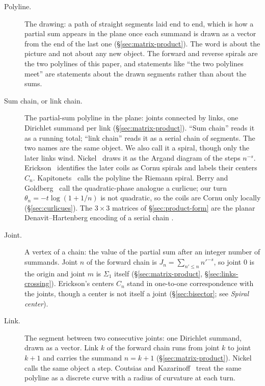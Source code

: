 \documentclass[11pt]{article}
\theoremstyle{definition}
\begin{document}
\begin{description}
\item[Polyline.]
The drawing: a path of straight segments laid end to end, which is
how a partial sum appears in the plane once each summand is drawn as
a vector from the end of the last one
(\S\ref{sec:matrix-product}).
The word is about the picture and not about any new object. The
forward and reverse spirals are the two polylines of this paper, and
statements like ``the two polylines meet'' are statements about the
drawn segments rather than about the sums.

\item[Sum chain, or link chain.]
The partial-sum polyline in the plane: joints connected by links,
one Dirichlet summand per link
(\S\ref{sec:matrix-product}).
``Sum chain'' reads it as a running total; ``link chain'' reads it
as a serial chain of segments. The two names are the same object.
We also call it a spiral, though only the later links wind.
Nickel~\cite{Nickel2013} draws it as the Argand diagram of the
steps $n^{-s}$.
Erickson~\cite{Erickson2005} identifies the later coils as Cornu
spirals and labels their centers $C_n$.
Kapitonets~\cite{Kapitonets2019} calls the polyline the Riemann
spiral.
Berry and Goldberg~\cite{BerryGoldberg1988} call the quadratic-phase
analogue a curlicue; our turn $\theta_n=-t\log(1+1/n)$ is not
quadratic, so the coils are Cornu only locally
(\S\ref{sec:curlicues}).
The $3\times3$ matrices of \S\ref{sec:product-form} are the planar
Denavit--Hartenberg encoding of a serial chain
\cite{DenavitHartenberg1955}.

\item[Joint.]
A vertex of a chain: the value of the partial sum after an integer
number of summands.
Joint $n$ of the forward chain is $J_n=\sum_{n'\le n}n'^{-s}$, so
joint $0$ is the origin and joint $m$ is $\Sigma_1$ itself
(\S\ref{sec:matrix-product}, \S\ref{sec:links-crossing}).
Erickson's centers $C_n$ stand in one-to-one correspondence with the
joints, though a center is not itself a joint
(\S\ref{sec:bisector}; see \emph{Spiral center}).

\item[Link.]
The segment between two consecutive joints: one Dirichlet summand,
drawn as a vector.
Link $k$ of the forward chain runs from joint $k$ to joint $k+1$ and
carries the summand $n=k+1$
(\S\ref{sec:matrix-product}).
Nickel calls the same object a step.
Coutsias and Kazarinoff~\cite{CoutsiasKazarinoff1987} treat the same
polyline as a discrete curve with a radius of curvature at each turn.


\end{description}
\end{document}
